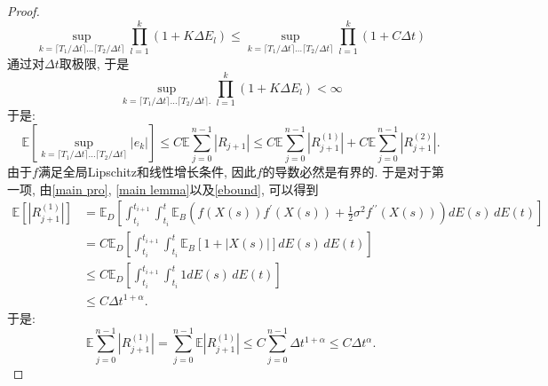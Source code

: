 \begin{proof}
\begin{equation*}
		\sup\limits_{k=\lceil T_1/\Delta t \rceil \ldots \lceil T_2/\Delta t \rceil} \prod\limits_{l=1}^{k}(1+K\Delta E_l) \le \sup\limits_{k=\lceil T_1/\Delta t \rceil \ldots \lceil T_2/\Delta t \rceil} \prod\limits_{l=1}^{k}(1+C\Delta t)
	\end{equation*}
	通过对$\Delta t$取极限, 
	于是
	\begin{equation*}
		\sup\limits_{k=\lceil T_1/\Delta t \rceil \ldots \lceil T_2/\Delta t \rceil. } \prod\limits_{l=1}^{k}(1+K\Delta E_l) < \infty
	\end{equation*}
	于是:
	\begin{equation}
		\mathbb{E}\left[\sup\limits_{k=\lceil T_1/\Delta t \rceil \ldots \lceil T_2/\Delta t \rceil}\left|e_k\right|\right] \leq C\mathbb{E}\sum_{j=0}^{n-1}|R_{j+1}| \leq C\mathbb{E}\sum\limits_{j=0}^{n-1}|R_{j+1}^{(1)}| + C\mathbb{E}\sum\limits_{j=0}^{n-1}|R_{j+1}^{(2)}|. 
	\end{equation}
	由于$f$满足全局Lipschitz和线性增长条件, 因此$f$的导数必然是有界的. 
	于是对于第一项,  由\cref{main pro}, \cref{main lemma}以及\cref{ebound}, 可以得到
	\begin{align*}
		\mathbb{E} \left[|R_{j+1}^{(1)}| \right] &= \mathbb{E}_D \left[
		\int_{t_i}^{t_{i+1}} \int_{t_i}^{t}  \mathbb{E}_B \left( f(X(s)) f^{\prime}(X(s)) + \frac{1}{2} \sigma^2 f^{\prime\prime}(X(s)) \right) dE(s) \, dE(t)
		\right] \\
		&= C\mathbb{E}_D \left[
		\int_{t_i}^{t_{i+1}} \int_{t_i}^{t}  \mathbb{E}_B \left[1+|X(s)| \right] dE(s) \, dE(t)
		\right] \\
		& \le C\mathbb{E}_D \left[
		\int_{t_i}^{t_{i+1}} \int_{t_i}^{t}  1 dE(s) \, dE(t)
		\right] \\
		&\le C\Delta t^{1+\alpha}. 
	\end{align*}
	于是:
	\begin{equation}
		\mathbb{E}\sum\limits_{j=0}^{n-1}|R_{j+1}^{(1)}|= \sum\limits_{j=0}^{n-1}\mathbb{E}|R_{j+1}^{(1)}| \leq
		C\sum\limits_{j=0}^{n-1}\Delta t^{1+\alpha} \le C\Delta t^\alpha. 
	\end{equation}
	

\end{proof}
